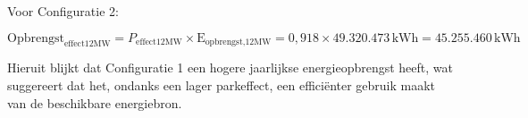 Voor Configuratie 2:

\begin{equation} \label{eq:23}
\text{Opbrengst}_{\text{effect12MW}} = P_{\text{effect12MW}} \times \text{E}_{\text{opbrengst,12MW}} = 0,918 \times 49.320.473 \, \text{kWh} = 45.255.460 \, \text{kWh}
\end{equation}

Hieruit blijkt dat Configuratie 1 een hogere jaarlijkse energieopbrengst heeft, wat suggereert dat het, ondanks een lager parkeffect, een efficiënter gebruik maakt van de beschikbare energiebron.
